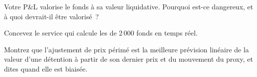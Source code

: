 \begin{interviewq}\label{iq:hf:etf-market-making:4}
Votre P\&L valorise le fonds à sa valeur liquidative. Pourquoi est-ce dangereux, et à quoi devrait-il être valorisé~?
\end{interviewq}

\begin{interviewq}\label{iq:hf:etf-market-making:5}
Concevez le service qui calcule les  de 2\,000 fonds en temps réel.
\end{interviewq}

\begin{interviewq}\label{iq:hf:etf-market-making:6}
Montrez que l'ajustement de prix périmé est la meilleure prévision linéaire de la valeur d'une détention à partir de son dernier prix et du mouvement du proxy, et dites quand elle est
biaisée.
\end{interviewq}

